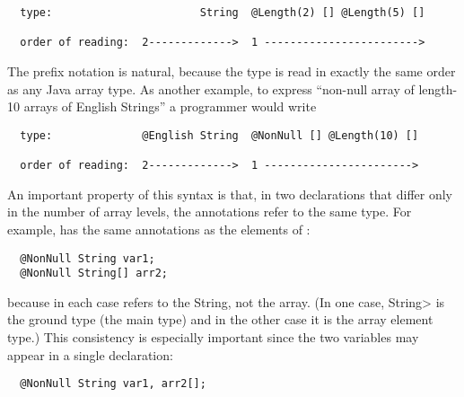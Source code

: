 \documentclass[10pt]{article}
\newcommand{\preverbnegspace}{\vspace{-5pt}}
\begin{document}
\begin{Verbatim}
  type:                       String  @Length(2) [] @Length(5) []

  order of reading:  2------------->  1 ------------------------>
\end{Verbatim}

The prefix notation is natural, because the type is read in exactly
the same order as any Java array type.  As another example, to express
``non-null array of length-10 arrays of English Strings'' a programmer
would write

\begin{Verbatim}
  type:              @English String  @NonNull [] @Length(10) []

  order of reading:  2------------->  1 ----------------------->
\end{Verbatim}




An important property of this syntax is that, in two declarations that
differ only in the number of array levels, the annotations refer to the same
type.  For example,  has
the same annotations as the elements of :

\preverbnegspace
\begin{Verbatim}
  @NonNull String var1;
  @NonNull String[] arr2;
\end{Verbatim}

\noindent
because in each case  refers to the String, not the array.
(In one case, \<String> is the ground type (the main type) and in the other
case it is the array element type.)
This consistency is especially important since the two variables may appear in a single
declaration:

\preverbnegspace
\begin{Verbatim}
  @NonNull String var1, arr2[];
\end{Verbatim}

% 
% 


% 
\end{document}

